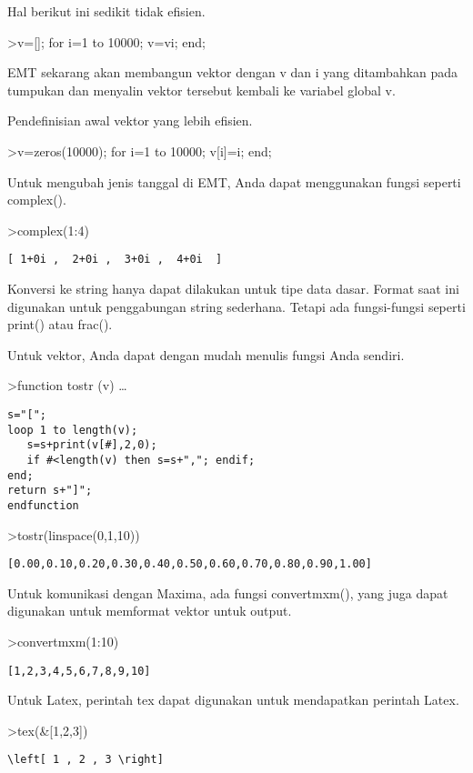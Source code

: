 \documentclass[
]{book}
\begin{document}
Hal berikut ini sedikit tidak efisien.

\textgreater v={[}{]}; for i=1 to 10000; v=v\textbar i; end;

EMT sekarang akan membangun vektor dengan v dan i yang ditambahkan pada tumpukan dan menyalin vektor tersebut kembali ke variabel global v.

Pendefinisian awal vektor yang lebih efisien.

\textgreater v=zeros(10000); for i=1 to 10000; v{[}i{]}=i; end;

Untuk mengubah jenis tanggal di EMT, Anda dapat menggunakan fungsi seperti complex().

\textgreater complex(1:4)

\begin{verbatim}
[ 1+0i ,  2+0i ,  3+0i ,  4+0i  ]
\end{verbatim}

Konversi ke string hanya dapat dilakukan untuk tipe data dasar. Format saat ini digunakan untuk penggabungan string sederhana. Tetapi ada fungsi-fungsi seperti print() atau frac().

Untuk vektor, Anda dapat dengan mudah menulis fungsi Anda sendiri.

\textgreater function tostr (v) \ldots{}

\begin{verbatim}
s="[";
loop 1 to length(v);
   s=s+print(v[#],2,0);
   if #<length(v) then s=s+","; endif;
end;
return s+"]";
endfunction
\end{verbatim}

\textgreater tostr(linspace(0,1,10))

\begin{verbatim}
[0.00,0.10,0.20,0.30,0.40,0.50,0.60,0.70,0.80,0.90,1.00]
\end{verbatim}

Untuk komunikasi dengan Maxima, ada fungsi convertmxm(), yang juga dapat digunakan untuk memformat vektor untuk output.

\textgreater convertmxm(1:10)

\begin{verbatim}
[1,2,3,4,5,6,7,8,9,10]
\end{verbatim}

Untuk Latex, perintah tex dapat digunakan untuk mendapatkan perintah Latex.

\textgreater tex(\&{[}1,2,3{]})

\begin{verbatim}
\left[ 1 , 2 , 3 \right] 
\end{verbatim}
\end{document}
